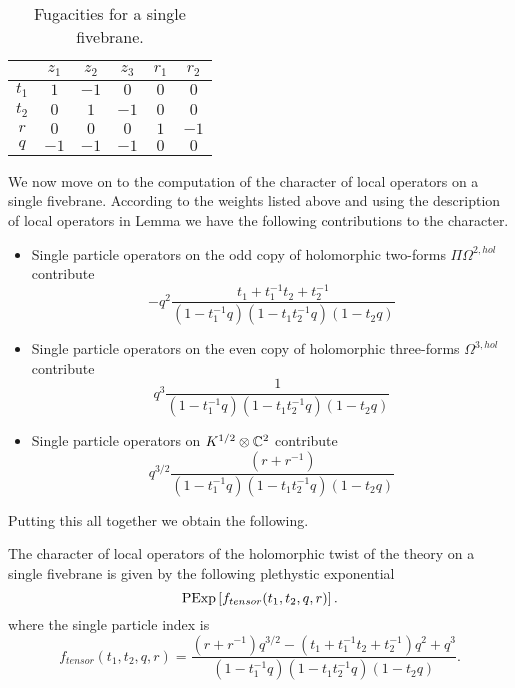 \documentclass[11pt]{amsart}
\begin{document}
\begin{table}
\begin{center}
\begin{tabular}{c c c c c c}
  & $z_{1}$ & $z_{2}$ & $z_{3}$ & $r_{1}$ & $r_{2}$ \\
  \hline
  $t_{1}$ & $1$ & $-1$ & $0$ & $0$ & $0$ \\
  $t_{2}$ & $0$ & $1$ & $-1$ & $0$ & $0$ \\
  $r$ & $0$ & $0$ & $0$ & $1$ & $-1$ \\
  $q$ & $-1$ & $-1$ & $-1$ & $0$ & $0$
\end{tabular}
\caption{Fugacities for a single fivebrane.}
\end{center}
\label{tbl:weights1}
\end{table}

\parsec

We now move on to the computation of the character of local operators on a single fivebrane.
According to the weights listed above and using the description of local operators in Lemma \label{lem:single} we have the following contributions to the character.

\begin{itemize}
\item Single particle operators on the odd copy of holomorphic two-forms $\Pi \Omega^{2,hol}$ contribute
\[
- q^2 \frac{t_1  + t_1^{-1} t_2  + t_2^{-1} }{(1-t_1^{-1}q) (1-t_1 t_2^{-1} q) (1-t_2 q)} 
\]
\item Single particle operators on the even copy of holomorphic three-forms $\Omega^{3,hol}$ contribute
\[
q^3 \frac{1}{(1-t_1^{-1}q) (1-t_1 t_2^{-1} q) (1-t_2 q)} 
\]
\item Single particle operators on $K^{1/2} \otimes \mathbb{C}^2$ contribute
\[
q^{3/2}\frac{(r + r^{-1})}{(1-t_1^{-1}q) (1-t_1 t_2^{-1} q) (1-t_2 q)}
\]
\end{itemize}

Putting this all together we obtain the following.

\begin{prop}
The character of local operators of the holomorphic twist of the theory on a single fivebrane is given by the following plethystic exponential
\[
{\rm PExp} \left[f_{tensor} (t_1,t_2,q,r) \right] .
\]
where the single particle index is
\[
f_{tensor} (t_1,t_2,q,r) = \frac{(r + r^{-1})q^{3/2} - (t_1 + t_1^{-1} t_2 + t_2^{-1} )q^2 + q^3}{(1-t_1^{-1}q) (1-t_1 t_2^{-1} q) (1-t_2 q)} .
\]
\end{prop}

\parsec
\end{document}
